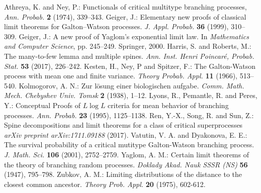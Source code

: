 \documentclass[12pt,a4paper]{amsart}
\numberwithin{equation}{section}
\begin{document}
\begin{thebibliography}{99}
	Athreya, K.  and  Ney, P.:
	Functionals of critical multitype branching processes,
	{\it Ann. Probab.}
	{\bf 2} (1974), 339--343.
	Geiger, J.:
	Elementary new proofs of classical limit theorems for Galton--Watson processes.
	{\it J. Appl. Probab.}
	\textbf{36} (1999), 310--309.
	Geiger, J.:
	A new proof of Yaglom's exponential limit law.
	In {\it Mathematics and Computer Science},
	pp. 245--249. Springer, 2000.
	Harris, S. and Roberts, M.:
	The many-to-few lemma and multiple spines.
	{\it Ann.  Inst. Henri Poincar{\'e}, Probab. Stat.}
	\textbf{53} (2017), 226--242.
	Kesten, H.,  Ney, P and Spitzer, F.:
	The Galton-Watson process with mean one and finite variance.
	{\it Theory Probab. Appl.}
	\textbf{11} (1966), 513--540.
	Kolmogorov, A. N.:
	Zur l{\"o}sung einer biologischen aufgabe.
	{\it Comm. Math. Mech. Chebyshev Univ. Tomsk}
	\textbf{2} (1938), 1--12.
	Lyons, R.,  Pemantle, R. and Peres, Y.:
	Conceptual Proofs of $ L \log L $ criteria for mean behavior of branching processes.
	{\it Ann. Probab.} \textbf{23} (1995), 1125--1138.
	Ren, Y.-X., Song, R. and Sun, Z.:
	Spine decompositions and limit theorems for a class of critical superprocesses
	{\it arXiv preprint arXiv:1711.09188}
	(2017).
	Vatutin, V. A. and Dyakonova,  E. E.:
	The survival probability of a critical mutitype Galton-Watson branching process.
	{\it J.  Math. Sci.}
	\textbf{106} (2001), 2752--2759.
	Yaglom, A. M.:
	Certain limit theorems of the theory of branching random processes.
	{\it Doklady Akad. Nauk SSSR (NS)}
	\textbf{56} (1947), 795--798.
	Zubkov, A. M.:
	Limiting distributions of the distance to the closest common ancestor.
	{\it Theory Prob. Appl.}
	\textbf{20} (1975), 602-612.

\end{thebibliography}
\end{document}
